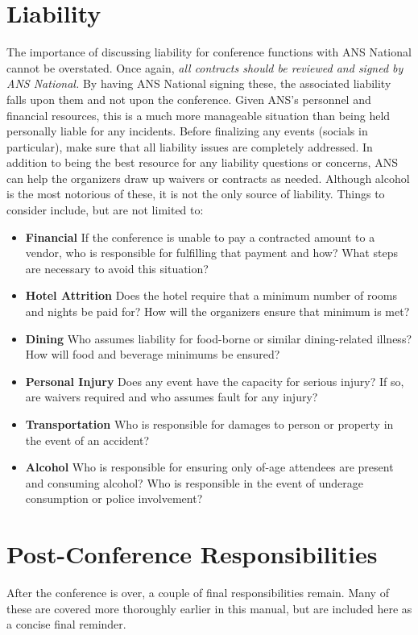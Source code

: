 \documentclass[12pt]{article}
\begin{document}
\section{Liability}
The importance of discussing liability for conference functions with ANS National cannot be overstated.
Once again, \emph{all contracts should be reviewed and signed by ANS National.}
By having ANS National signing these, the associated liability falls upon them and not upon the conference.
Given ANS's personnel and financial resources, this is a much more manageable situation than being held personally liable for any incidents.
Before finalizing any events (socials in particular), make sure that all liability issues are completely addressed.
In addition to being the best resource for any liability questions or concerns, ANS can help the organizers draw up waivers or contracts as needed.
Although alcohol is the most notorious of these, it is not the only source of liability.
Things to consider include, but are not limited to:
\begin{itemize}
    \item \textbf{Financial} If the conference is unable to pay a contracted amount to a vendor, who is responsible for fulfilling that payment and how? What steps are necessary to avoid this situation?
    \item \textbf{Hotel Attrition} Does the hotel require that a minimum number of rooms and nights be paid for? How will the organizers ensure that minimum is met?
    \item \textbf{Dining} Who assumes liability for food-borne or similar dining-related illness? How will food and beverage minimums be ensured?
    \item \textbf{Personal Injury} Does any event have the capacity for serious injury? If so, are waivers required and who assumes fault for any injury?
    \item \textbf{Transportation} Who is responsible for damages to person or property in the event of an accident?
    \item \textbf{Alcohol} Who is responsible for ensuring only of-age attendees are present and consuming alcohol? Who is responsible in the event of underage consumption or police involvement?
\end{itemize}

\clearpage

\section{Post-Conference Responsibilities}
After the conference is over, a couple of final responsibilities remain. Many of these are covered more thoroughly earlier in this manual, but are included here as a concise final reminder.
\end{document}
